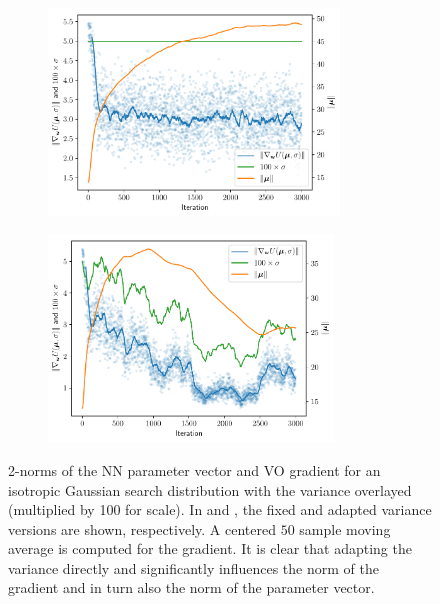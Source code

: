 \begin{figure}[tbp!]
    \begin{subfigure}[b]{0.49\textwidth}
        \centering
        \includegraphics[height=5.5cm]{graphics/E031-NORM-analysis/isotropic-fixed-1-param-and-grad-and-variance-norm.pdf}
        \caption{}
        \label{fig: Theory: E031-NORM-analysis/isotropic-fixed-1-param-and-grad-and-variance-norm}
    \end{subfigure}
    \hfill
    \begin{subfigure}[b]{0.49\textwidth}
        \centering
        \includegraphics[height=5.5cm]{graphics/E031-NORM-analysis/isotropic-adapted-1-param-and-grad-and-variance-norm.pdf}
        \caption{}
        \label{fig: Theory: E031-NORM-analysis/isotropic-adapted-1-param-and-grad-and-variance-norm}
    \end{subfigure}
    \caption{
        2-norms of the \gls{NN} parameter vector and \gls{VO} gradient for an isotropic Gaussian search distribution with the variance overlayed (multiplied by 100 for scale). In  and , the fixed and adapted variance versions are shown, respectively. A centered $50$ sample moving average is computed for the gradient. It is clear that adapting the variance directly and significantly influences the norm of the gradient and in turn also the norm of the parameter vector.
    }
    \label{fig: Theory: E031-NORM-analysis-isotropic}
\end{figure}

